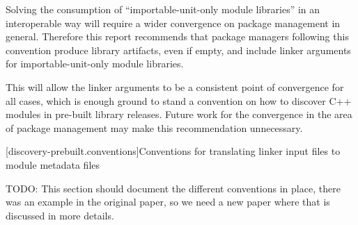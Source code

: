 \pnum Solving the consumption of “importable-unit-only module
libraries” in an interoperable way will require a wider convergence on
package management in general. Therefore this report recommends that
package managers following this convention produce library artifacts,
even if empty, and include linker arguments for importable-unit-only
module libraries.

\pnum This will allow the linker arguments to be a consistent point of
convergence for all cases, which is enough ground to stand a
convention on how to discover C++ modules in pre-built library
releases. Future work for the convergence in the area of package
management may make this recommendation unnecessary.

[discovery-prebuilt.conventions]{Conventions for translating
  linker input files to module metadata files}

\pnum TODO: This section should document the different conventions in
place, there was an example in the original paper, so we need a new
paper where that is discussed in more details.
